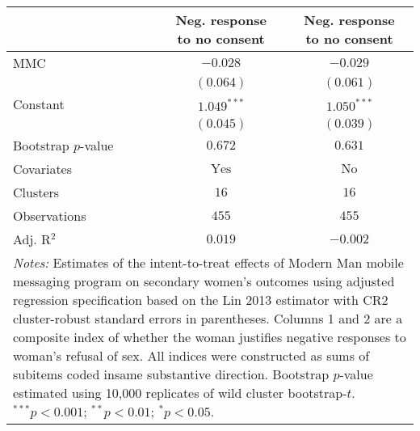 
\begin{tabular}{l c c}
\toprule
 & \shortstack{Neg. response \\ to no consent} & \shortstack{Neg. response \\ to no consent} \\
\midrule
MMC                 & $-0.028$       & $-0.029$      \\
                    & $(0.064)$      & $(0.061)$     \\
Constant            & $1.049^{***}$  & $1.050^{***}$ \\
                    & $(0.045)$      & $(0.039)$     \\
\midrule
Bootstrap $p$-value & $0.672$        & $0.631$       \\
Covariates          & $\textrm{Yes}$ & $\textrm{No}$ \\
Clusters            & $16$           & $16$          \\
Observations        & $455$          & $455$         \\
Adj. R$^2$          & $0.019$        & $-0.002$      \\
\bottomrule
\multicolumn{3}{l}{\scriptsize{\parbox{\linewidth}{\vspace{2pt}
       \textit{Notes:} Estimates of the intent-to-treat effects of Modern Man mobile
       messaging program on secondary women's outcomes using adjusted regression
       specification based on the Lin 2013 estimator with CR2 cluster-robust
       standard errors in parentheses. Columns 1 and 2 are a composite index of
       whether the woman justifies negative responses to woman's refusal of sex. All indices were
       constructed as sums of subitems coded insame substantive direction. 
       Bootstrap $p$-value estimated using 10,000 replicates of wild cluster bootstrap-$t$.\\ $^{***}p<0.001$; $^{**}p<0.01$; $^{*}p<0.05$.}}}
\end{tabular}
